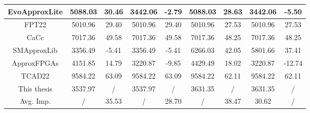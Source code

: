 \begin{table}[!htbp]
\begin{center}
{\begin{tabular}{|c|c|c|c|c|c|c|c|c|}
        \hline
        EvoApproxLite \cite{AC:AM:CGP_EvoLite} & 5088.03 & 30.46 & 3442.06 & -2.79 & 5088.03 & 28.63 & 3442.06 & -5.50 \\
        \hline
        FPT22 \cite{AC:AM:FPGA:FPT22} & 5010.96 & 29.40 & 5010.96 & 29.40 & 5010.96 & 27.53 & 5010.96 & 27.53 \\
        \hline
        CaCc \cite{AC:AM:FPGA:CaCc} & 7017.36 & 49.58 & 7017.36 & 49.58 & 7017.36 & 48.25 & 7017.36 & 48.25 \\
        \hline
        SMApproxLib \cite{AC:AM:FPGA:SMApproxLib} & 3356.49 & -5.41 & 3356.49 & -5.41 & 6266.03 & 42.05 & 5801.66 & 37.41 \\
        \hline
        ApproxFPGAs \cite{AC:AM:FPGA:ApproxFPGAs} & 4151.85 & 14.79 & 3220.87 & -9.85 & 4429.49 & 18.02 & 3220.87 & -12.74 \\
        \hline
        TCAD22 \cite{AC:AM:FPGA:TCAD22} & 9584.22 & 63.09 & 9584.22 & 63.09 & 9584.22 & 62.11 & 9584.22 & 62.11 \\
        \hline
        This thesis & 3537.97 & / & 3537.97 & / & 3631.35 & / & 3631.35 & / \\
        \hline
        Avg. Imp. & / & 35.53 & / & 28.70 & / & 38.47 & 30.62 & / \\
        \hline
        \end{tabular}
    }
        \label{AC:AM:FPGA:AMG:Table:PDAE}
        \end{center}
\end{table}
